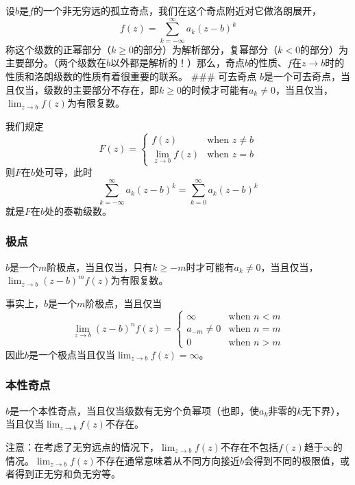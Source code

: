 设\(b\)是\(f\)的一个非无穷远的孤立奇点，我们在这个奇点附近对它做洛朗展开，
\[
f(z) = \sum_{k=-\infty}^\infty a_k (z - b)^k
\]
称这个级数的正幂部分（\(k\geq 0\)的部分）为解析部分，复幂部分（\(k<0\)的部分）为主要部分。（两个级数在\(b\)以外都是解析的！）那么，奇点\(b\)的性质、\(f\)在\(z\rightarrow b\)时的性质和洛朗级数的性质有着很重要的联系。
\#\#\# 可去奇点
\(b\)是一个可去奇点，当且仅当，级数的主要部分不存在，即\(k \geq 0\)的时候才可能有\(a_k \neq 0\)，当且仅当，\(\lim_{z\rightarrow b} f(z)\)为有限复数。

我们规定 \[
F(z) =
\begin{cases}
    f(z) & \text{when $z \neq b$} \\
    \lim_{z\rightarrow b} f(z) & \text{when $z=b$}
\end{cases}
\] 则\(F\)在\(b\)处可导，此时 \[
\sum_{k=-\infty}^\infty a_k (z - b)^k = \sum_{k=0}^\infty a_k (z - b)^k
\] 就是\(F\)在\(b\)处的泰勒级数。

\hypertarget{ux6781ux70b9}{%
\subsubsection{极点}\label{ux6781ux70b9}}

\(b\)是一个\(m\)阶极点，当且仅当，只有\(k \geq -m\)时才可能有\(a_k \neq 0\)，当且仅当，\(\lim_{z\rightarrow b}(z-b)^m f(z)\)为有限复数。

事实上，\(b\)是一个\(m\)阶极点，当且仅当 \[
\lim_{z\rightarrow b} (z-b)^n f(z) = 
\begin{cases}
    \infty & \text{when $n<m$} \\
    a_{-m} \neq 0 & \text{when $n=m$} \\
    0 & \text{when $n>m$}
\end{cases}
\] 因此\(b\)是一个极点当且仅当\(\lim_{z\rightarrow b}f(z) = \infty\)。

\hypertarget{ux672cux6027ux5947ux70b9}{%
\subsubsection{本性奇点}\label{ux672cux6027ux5947ux70b9}}

\(b\)是一个本性奇点，当且仅当级数有无穷个负幂项（也即，使\(a_k\)非零的\(k\)无下界），当且仅当\(\lim_{z\rightarrow b} f(z)\)不存在。

注意：在考虑了无穷远点的情况下，\(\lim_{z\rightarrow b} f(z)\)不存在不包括\(f(z)\)趋于\(\infty\)的情况。\(\lim_{z\rightarrow b} f(z)\)不存在通常意味着从不同方向接近\(b\)会得到不同的极限值，或者得到正无穷和负无穷等。

